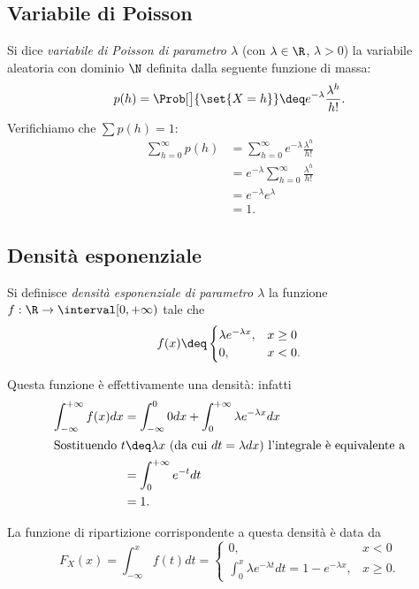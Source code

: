 \subsection{Variabile di Poisson}
Si dice \emph{variabile di Poisson di parametro $\lambda$} (con $\lambda \in \R$, $\lambda > 0$) la variabile aleatoria con dominio $\N$ definita dalla seguente funzione di massa: \[
    p(h) = \Prob[\big]{\set{X = h}} \deq e^{-\lambda}\frac{\lambda^h}{h!}.    
\]
Verifichiamo che $\sum p(h) = 1$: \begin{align*}
    \sum_{h = 0}^\infty p(h)
    &= \sum_{h = 0}^\infty e^{-\lambda}\frac{\lambda^h}{h!}\\
    &= e^{-\lambda} \sum_{h = 0}^\infty \frac{\lambda^h}{h!}\\
    &= e^{-\lambda}e^{\lambda}\\
    &= 1.
\end{align*}

\subsection{Densità esponenziale}
Si definisce \emph{densità esponenziale di parametro $\lambda$} la funzione $f : \R \to \interval[{0, +\infty})$ tale che \[
    f(x) \deq \begin{cases}
        \lambda e^{-\lambda x}, &x \geq 0\\
        0, &x < 0.
    \end{cases} 
\]

Questa funzione è effettivamente una densità: infatti \begin{align*}
    \int_{-\infty}^{+\infty} f(x)dx
    &= \int_{-\infty}^0 0dx + \int_0^{+\infty} \lambda e^{-\lambda x}dx\\
    \intertext{Sostituendo $t \deq \lambda x$ (da cui $dt = \lambda dx$) l'integrale è equivalente a}
    &= \int_0^{+\infty} e^{-t}dt\\
    &= 1.
\end{align*}

La funzione di ripartizione corrispondente a questa densità è data da \begin{equation}
    \label{eq:cdf_exponential}
    F_X(x) = \int_{-\infty}^x f(t)dt = \begin{cases}
        0, &x < 0 \\[5pt]
        \displaystyle\int_0^x \lambda e^{-\lambda t}dt = 1 - e^{-\lambda x}, &x \geq 0.
    \end{cases}    
\end{equation}


